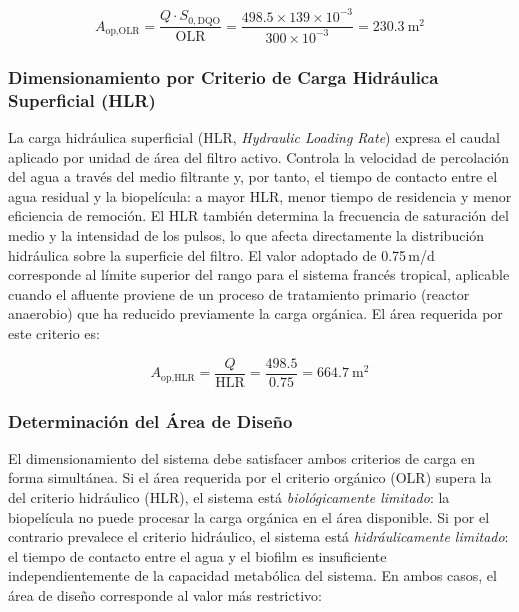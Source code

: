 \documentclass[12pt,a4paper]{article}
\begin{document}
\begin{equation}
A_\text{op,OLR} = \frac{Q \cdot S_{0,\text{DQO}}}{\text{OLR}} = \frac{498.5 \times 139 \times 10^{-3}}{300 \times 10^{-3}} = 230.3\ \text{m}^2
\end{equation}

\subsubsection*{Dimensionamiento por Criterio de Carga Hidráulica Superficial (HLR)}

La carga hidráulica superficial (HLR, \textit{Hydraulic Loading Rate}) expresa el caudal aplicado por unidad de área del filtro activo. Controla la velocidad de percolación del agua a través del medio filtrante y, por tanto, el tiempo de contacto entre el agua residual y la biopelícula: a mayor HLR, menor tiempo de residencia y menor eficiencia de remoción. El HLR también determina la frecuencia de saturación del medio y la intensidad de los pulsos, lo que afecta directamente la distribución hidráulica sobre la superficie del filtro. El valor adoptado de 0.75\,m/d corresponde al límite superior del rango para el sistema francés tropical, aplicable cuando el afluente proviene de un proceso de tratamiento primario (reactor anaerobio) que ha reducido previamente la carga orgánica. El área requerida por este criterio es:

\begin{equation}
A_\text{op,HLR} = \frac{Q}{\text{HLR}} = \frac{498.5}{0.75} = 664.7\ \text{m}^2
\end{equation}

\subsubsection*{Determinación del Área de Diseño}

El dimensionamiento del sistema debe satisfacer ambos criterios de carga en forma simultánea. Si el área requerida por el criterio orgánico (OLR) supera la del criterio hidráulico (HLR), el sistema está \textit{biológicamente limitado}: la biopelícula no puede procesar la carga orgánica en el área disponible. Si por el contrario prevalece el criterio hidráulico, el sistema está \textit{hidráulicamente limitado}: el tiempo de contacto entre el agua y el biofilm es insuficiente independientemente de la capacidad metabólica del sistema. En ambos casos, el área de diseño corresponde al valor más restrictivo:
\end{document}
